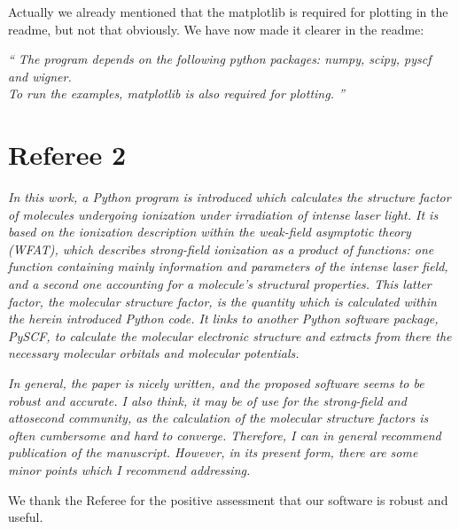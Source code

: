 \documentclass[a4paper,11pt]{article}
\begin{document}
\vspace{1em}

Actually we already mentioned that the matplotlib is required for plotting in the readme, but not that obviously.
We have now made it clearer in the readme:

{\em ``
The program depends on the following python packages: numpy, scipy, pyscf and wigner. \\
To run the examples, matplotlib is also required for plotting.
''}

\vspace{2em}



\section*{Referee 2}

\textit{
In this work, a Python program is introduced which calculates the structure factor of molecules undergoing ionization under irradiation of intense laser light. It is based on the ionization description within the weak-field asymptotic theory (WFAT), which describes strong-field ionization as a product of functions: one function containing mainly information and parameters of the intense laser field, and a second one accounting for a molecule's structural properties. This latter factor, the molecular structure factor, is the quantity which is calculated within the herein introduced Python code. It links to another Python software package, PySCF, to calculate the molecular electronic structure and extracts from there the necessary molecular orbitals and molecular potentials.}

\textit{In general, the paper is nicely written, and the proposed software seems to be robust and accurate. I also think, it may be of use for the strong-field and attosecond community, as the calculation of the molecular structure factors is often cumbersome and hard to converge. Therefore, I can in general recommend publication of the manuscript. However, in its present form, there are some minor points which I recommend addressing.
}

\vspace{1em}

We thank the Referee for the positive assessment that our software is robust and useful.

\vspace{2em}
\end{document}
